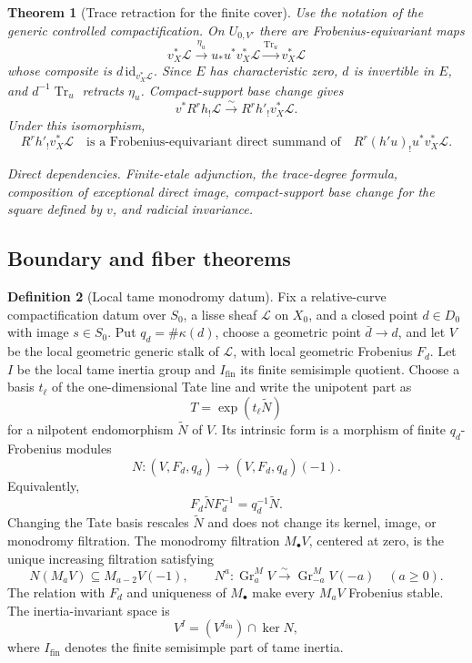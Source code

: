 \documentclass[10pt]{article}
\newtheorem{theorem}{Theorem}[section]
\theoremstyle{definition}
\newtheorem{definition}[theorem]{Definition}
\newcommand{\dep}[1]{\par\smallskip\noindent\textit{Direct dependencies.} #1\par}
\begin{document}
\begin{theorem}[Trace retraction for the finite cover]
Use the notation of the generic controlled compactification.  On
\(U_{0,V'}\) there are Frobenius-equivariant maps
\[
 v_X^*\mathcal L\xrightarrow{\eta_u}
 u_*u^*v_X^*\mathcal L
 \xrightarrow{\operatorname{Tr}_u}v_X^*\mathcal L
\]
whose composite is \(d\,\mathrm{id}_{v_X^*\mathcal L}\).  Since \(E\) has
characteristic zero, \(d\) is invertible in \(E\), and
\(d^{-1}\operatorname{Tr}_u\) retracts \(\eta_u\).  Compact-support base
change gives
\[
 v^*R^rh_!\mathcal L
 \xrightarrow{\sim}R^rh'_!v_X^*\mathcal L.
\]
Under this isomorphism,
\[
 R^rh'_!v_X^*\mathcal L
 \quad\text{is a Frobenius-equivariant direct summand of}\quad
 R^r(h'u)_!u^*v_X^*\mathcal L.
\]
\dep{Finite-etale adjunction, the trace-degree formula, composition of
exceptional direct image, compact-support base change for the square
defined by \(v\), and radicial invariance.}
\end{theorem}

\subsection{Boundary and fiber theorems}

\begin{definition}[Local tame monodromy datum]
Fix a relative-curve compactification datum over \(S_0\), a lisse sheaf
\(\mathcal L\) on \(X_0\), and a closed point \(d\in D_0\) with image
\(s\in S_0\).  Put \(q_d=\#\kappa(d)\), choose a geometric point
\(\bar d\to d\), and let \(V\) be the local geometric generic stalk of
\(\mathcal L\), with local geometric Frobenius \(F_d\).  Let \(I\) be the
local tame inertia group and \(I_{\mathrm{fin}}\) its finite semisimple
quotient.  Choose a basis \(t_\ell\) of the one-dimensional Tate line and
write the unipotent part as
\[
                       T=\exp(t_\ell\widetilde N)
\]
for a nilpotent endomorphism \(\widetilde N\) of \(V\).  Its intrinsic form
is a morphism of finite \(q_d\)-Frobenius modules
\[
 N:(V,F_d,q_d)\longrightarrow(V,F_d,q_d)(-1).
\]
Equivalently,
\[
       F_d\widetilde NF_d^{-1}=q_d^{-1}\widetilde N.
\]
Changing the Tate basis rescales \(\widetilde N\) and does not change its kernel, image, or
monodromy filtration.
The monodromy filtration \(M_\bullet V\), centered at zero, is the unique
increasing filtration satisfying
\[
 N(M_aV)\subseteq M_{a-2}V(-1),\qquad
 N^a:\operatorname{Gr}_a^M V
       \xrightarrow{\sim}\operatorname{Gr}_{-a}^M V(-a)
       \quad(a\geq0).
\]
The relation with \(F_d\) and uniqueness of \(M_\bullet\) make every
\(M_aV\) Frobenius stable.
The inertia-invariant space is
\[
 V^I=(V^{I_{\mathrm{fin}}})\cap\ker N,
\]
where \(I_{\mathrm{fin}}\) denotes the finite semisimple part of tame
inertia.
\end{definition}
\end{document}
